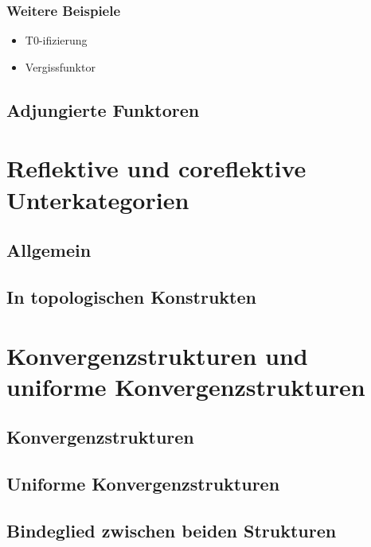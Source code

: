 \documentclass[serif,9pt]{beamer}
\begin{document}
\begin{frame}[fragile]
  \frametitle{Weitere Beispiele}
  \begin{itemize}
    \item T0-ifizierung
    \item Vergissfunktor
  \end{itemize}
\end{frame}

\subsection{Adjungierte Funktoren}

\section{Reflektive und coreflektive Unterkategorien}



\subsection{Allgemein}
\subsection{In topologischen Konstrukten}

\section{Konvergenzstrukturen und uniforme Konvergenzstrukturen}

\subsection{Konvergenzstrukturen}
\subsection{Uniforme Konvergenzstrukturen}
\subsection{Bindeglied zwischen beiden Strukturen}
\end{document}
